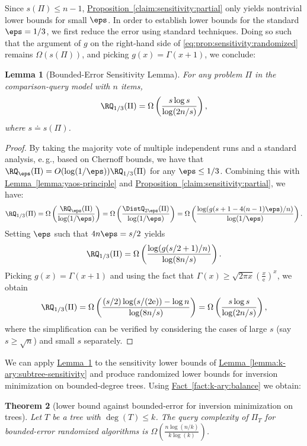\documentclass[11pt]{article}
\numberwithin{equation}{section}
\newtheorem{theorem}{Theorem}[section]
\newtheorem{lemma}[theorem]{Lemma}
\theoremstyle{definition}
\theoremstyle{plain}
\newcommand{\eee}{\mathrm e}
\newcommand{\eg}{e.\,g.}
\newcommand{\expref}[2]{\hyperref[#2]{#1~\ref{#2}}}
\begin{document}
Since $s(\Pi) \le n-1$, \expref{Proposition}{claim:sensitivity:partial} only yields nontrivial lower bounds for small $\eps$. In order to establish lower bounds for the standard $\eps=1/3$, we first reduce the error using standard techniques. Doing so such that the argument of $g$ on the right-hand side of \eqref{eq:prop:sensitivity:randomized} remains $\Omega(s(\Pi))$, and picking $g(x)=\Gamma(x+1)$, we conclude:

\begin{lemma}[Bounded-Error Sensitivity Lemma]
\label{lemma:randomized-sensitivity}
For any problem $\Pi$ in the comparison-query model with $n$ items, 
\[\RQ_{1/3}(\Pi) = \Omega \left(\frac{s \log s}{\log(2n/s)} \right), \]
where $s \doteq s(\Pi)$.
\end{lemma}

\begin{proof}
By taking the majority vote of multiple independent runs and a standard analysis, \eg, based on Chernoff bounds, we have that $\RQ_\eps(\Pi) = O(\log(1/\eps)) \RQ_{1/3}(\Pi)$ for any $\eps \le 1/3$. Combining this with \expref{Lemma}{lemma:yaos-principle} and \expref{Proposition}{claim:sensitivity:partial}, we have:
\[\RQ_{1/3}(\Pi) = \Omega \left( \frac{\RQ_{\eps}(\Pi)}{\log(1/\eps)} \right) = \Omega \left(  \frac{\DistQ_{2\eps}(\Pi)}{\log(1/\eps)} \right) =  \Omega \left( \frac{\log(g(s+1-4(n-1)\eps)/n)}{\log(1/\eps)}\right). \]
Setting $\eps$ such that $4n\eps = s/2$ yields
\[\RQ_{1/3}(\Pi) =  \Omega \left( \frac{\log(g(s/2+1)/n)}{\log(8n/s)}\right).
\]
Picking $g(x)=\Gamma(x+1)$ and using the fact that $\Gamma(x) \ge \sqrt{2\pi x} \left(\frac{x}{\eee}\right)^x$, %
we obtain
\[\RQ_{1/3}(\Pi) =  \Omega \left( \frac{(s/2)\log(s/(2\eee)) - \log n}{\log(8n/s)}\right) = \Omega \left( \frac{s\log s }{\log(2n/s)}\right),
\]
where the simplification can be verified by considering the cases of large $s$ (say $s \ge \sqrt{n}$) and small $s$ separately. 
\end{proof}

We can apply \expref{Lemma}{lemma:randomized-sensitivity} to the sensitivity lower bounds of \expref{Lemma}{lemma:k-ary:subtree-sensitivity} and produce randomized lower bounds for inversion minimization on bounded-degree trees. Using \expref{Fact}{fact:k-ary:balance} we obtain: 

\begin{theorem}[lower bound against bounded-error 
for inversion minimization on trees]
	Let $T$ be a tree with $\deg(T)\le k$. The query complexity of $\Pi_T$ for bounded-error randomized algorithms is $\Omega(\frac{n\log(n/k)}{k\log(k)})$.
\end{theorem}
\end{document}
